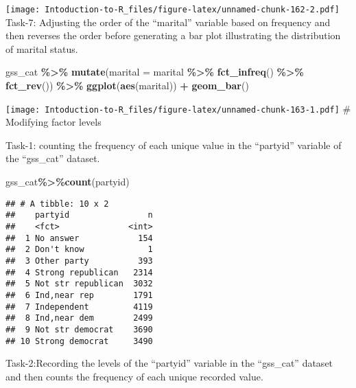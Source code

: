 \documentclass[
]{article}
\newenvironment{Shaded}{\begin{snugshade}}{\end{snugshade}}
\newcommand{\AttributeTok}[1]{\textcolor[rgb]{0.13,0.29,0.53}{#1}}
\newcommand{\FunctionTok}[1]{\textcolor[rgb]{0.13,0.29,0.53}{\textbf{#1}}}
\newcommand{\NormalTok}[1]{#1}
\newcommand{\SpecialCharTok}[1]{\textcolor[rgb]{0.81,0.36,0.00}{\textbf{#1}}}
\begin{document}
\texttt{[image: Intoduction-to-R\_files/figure-latex/unnamed-chunk-162-2.pdf]}
Task-7: Adjusting the order of the ``marital'' variable based on
frequency and then reverses the order before generating a bar plot
illustrating the distribution of marital status.

\begin{Shaded}
\begin{Highlighting}[]
\NormalTok{gss\_cat }\SpecialCharTok{\%\textgreater{}\%}
  \FunctionTok{mutate}\NormalTok{(}\AttributeTok{marital =}\NormalTok{ marital }\SpecialCharTok{\%\textgreater{}\%} \FunctionTok{fct\_infreq}\NormalTok{() }\SpecialCharTok{\%\textgreater{}\%} \FunctionTok{fct\_rev}\NormalTok{()) }\SpecialCharTok{\%\textgreater{}\%}
  \FunctionTok{ggplot}\NormalTok{(}\FunctionTok{aes}\NormalTok{(marital)) }\SpecialCharTok{+}
    \FunctionTok{geom\_bar}\NormalTok{()}
\end{Highlighting}
\end{Shaded}

\texttt{[image: Intoduction-to-R\_files/figure-latex/unnamed-chunk-163-1.pdf]}
\# Modifying factor levels

Task-1: counting the frequency of each unique value in the ``partyid''
variable of the ``gss\_cat'' dataset.

\begin{Shaded}
\begin{Highlighting}[]
\NormalTok{gss\_cat}\SpecialCharTok{\%\textgreater{}\%}\FunctionTok{count}\NormalTok{(partyid)}
\end{Highlighting}
\end{Shaded}

\begin{verbatim}
## # A tibble: 10 x 2
##    partyid                n
##    <fct>              <int>
##  1 No answer            154
##  2 Don't know             1
##  3 Other party          393
##  4 Strong republican   2314
##  5 Not str republican  3032
##  6 Ind,near rep        1791
##  7 Independent         4119
##  8 Ind,near dem        2499
##  9 Not str democrat    3690
## 10 Strong democrat     3490
\end{verbatim}

Task-2:Recording the levels of the ``partyid'' variable in the
``gss\_cat'' dataset and then counts the frequency of each unique
recorded value.
\end{document}
